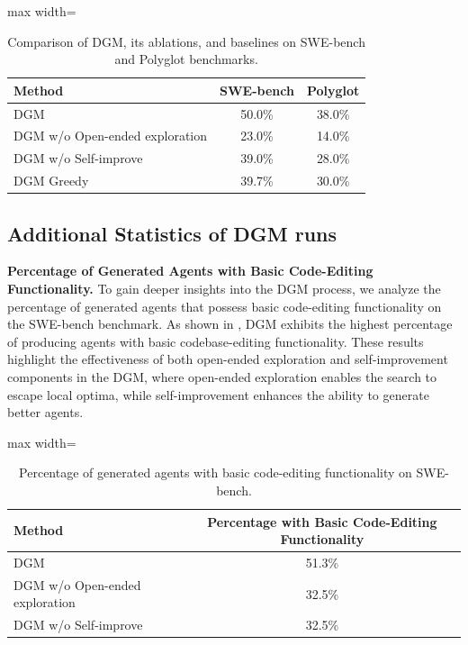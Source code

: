 \documentclass{article} %
\begin{document}
\begin{table}[H]
\centering
\caption{Comparison of DGM, its ablations, and baselines on SWE-bench and Polyglot benchmarks.}
\label{tab:DGM-greedy}
\begin{adjustbox}{max width=\textwidth} %
\begin{tabular}{lcc}
\toprule
\textbf{Method} & \textbf{SWE-bench} & \textbf{Polyglot} \\
\midrule
DGM & 50.0\% & 38.0\% \\
DGM w/o Open-ended exploration & 23.0\% & 14.0\% \\
DGM w/o Self-improve & 39.0\% & 28.0\% \\
DGM Greedy & 39.7\% & 30.0\% \\
\bottomrule
\end{tabular}
\end{adjustbox}
\end{table}

\subsection{Additional Statistics of DGM runs}
\textbf{Percentage of Generated Agents with Basic Code-Editing Functionality.}
To gain deeper insights into the DGM process, we analyze the percentage of generated agents that possess basic code-editing functionality on the SWE-bench benchmark. As shown in , DGM exhibits the highest percentage of producing agents with basic codebase-editing functionality. These results highlight the effectiveness of both open-ended exploration and self-improvement components in the DGM, where open-ended exploration enables the search to escape local optima, while self-improvement enhances the ability to generate better agents.

\begin{table}[H]
\centering
\caption{Percentage of generated agents with basic code-editing functionality on SWE-bench.}
\begin{adjustbox}{max width=\textwidth}
\begin{tabular}{lc}
\toprule
\textbf{Method} & \textbf{Percentage with Basic Code-Editing Functionality} \\
\midrule
DGM & 51.3\% \\
DGM w/o Open-ended exploration & 32.5\% \\
DGM w/o Self-improve & 32.5\% \\
\bottomrule
\end{tabular}
\end{adjustbox}
\label{tab:code_editing}
\end{table}
\end{document}
